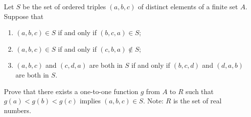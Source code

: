Let $S$ be the set of ordered triples $(a, b, c)$ of distinct elements
of a finite set $A$. Suppose that
\begin{enumerate}
\item $(a,b,c) \in S$ if and only if $(b,c,a) \in S$;
\item $(a,b,c) \in S$ if and only if $(c,b,a) \notin S$;
\item $(a,b,c)$ and $(c,d,a)$ are both in $S$ if and only if $(b,c,d)$
and $(d,a,b)$ are both in $S$.
\end{enumerate}
Prove that there exists a one-to-one function $g$ from $A$ to $R$ such
that $g(a) < g(b) < g(c)$ implies $(a,b,c) \in S$. Note: $R$ is the
set of real numbers.
